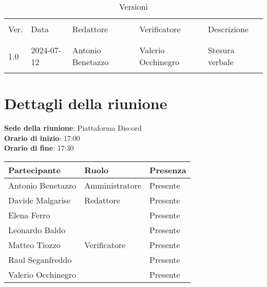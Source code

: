 \documentclass[italian,12pt]{article}
\begin{document}
\newcommand{\mySkip}[1][]{#1}



\newpage



\begin{table}[!h]
	\caption{Versioni}
	\footnotesize
	\begin{center}
		\begin{tabular}{ l l l l p{6cm} }
			\hline                                                                       \\[-2ex]
			Ver. & Data       & Redattore         & Verificatore       & Descrizione     \\
			\\[-2ex] \hline \\[-1.5ex]
			1.0  & 2024-07-12 & Antonio Benetazzo & Valerio Occhinegro & Stesura verbale \\
			\\[-1.5ex] \hline
		\end{tabular}
	\end{center}
\end{table}

\newpage

\tableofcontents

\newpage

\section{Dettagli della riunione}

\textbf{Sede della riunione}: Piattaforma Discord\\
\textbf{Orario di inizio}: 17:00\\
\textbf{Orario di fine}: 17:30\\

\begin{flushleft}
	\begin{table}[!h]
		\begin{tabular}{ |l|l|l| }
			\hline
			\textbf{Partecipante} & \textbf{Ruolo} & \textbf{Presenza} \\
			\hline
			Antonio Benetazzo     & Amministratore & Presente          \\
			Davide Malgarise      & Redattore      & Presente          \\
			Elena Ferro           &                & Presente          \\
			Leonardo Baldo        &                & Presente          \\
			Matteo Tiozzo         & Verificatore   & Presente          \\
			Raul Seganfreddo      &                & Presente          \\
			Valerio Occhinegro    &                & Presente          \\
			\hline
		\end{tabular}
	\end{table}
\end{flushleft}
\end{document}
